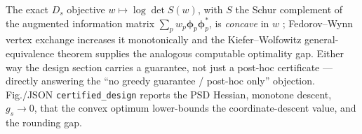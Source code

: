 \begin{remark}\label{rmk:u2-ds}
The exact $D_s$ objective $w\mapsto\log\det S(w)$, with $S$ the Schur complement of the
augmented information matrix $\sum_p w_p\bm\phi_p\bm\phi_p^{*}$, is \emph{concave} in $w$
\cite{boyd2004convex}; Fedorov--Wynn vertex exchange increases it monotonically and the
Kiefer--Wolfowitz general-equivalence theorem \cite{kiefer1960equivalence} supplies the
analogous computable optimality gap.  Either way the design section carries a guarantee, not
just a post-hoc certificate --- directly answering the ``no greedy guarantee / post-hoc only''
objection.  Fig./JSON \texttt{certified\_design} reports the PSD Hessian, monotone descent,
$g_s\!\to\!0$, that the convex optimum lower-bounds the coordinate-descent value, and the
rounding gap.
\end{remark}
